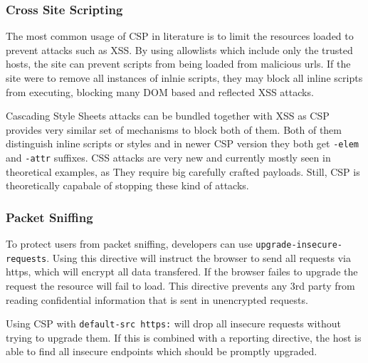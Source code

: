 \subsubsection{Cross Site Scripting}
The most common usage of CSP in literature is to limit the resources loaded to prevent attacks such as XSS.
By using allowlists which include only the trusted hosts, the site can prevent scripts from being loaded from malicious urls.
If the site were to remove all instances of inlnie scripts, they may block all inline scripts from executing, blocking many DOM based and reflected XSS attacks.

Cascading Style Sheets attacks can be bundled together with XSS as CSP provides very similar set of mechanisms to block both of them.
Both of them distinguish inline scripts or styles and in newer CSP version they both get \texttt{-elem} and \texttt{-attr} suffixes.
CSS attacks are very new and currently mostly seen in theoretical examples, as They require big carefully crafted payloads.
Still, CSP is theoretically capabale of stopping these kind of attacks.

\subsubsection{Packet Sniffing}
To protect users from packet sniffing, developers can use \texttt{upgrade-insecure-requests}.
Using this directive will instruct the browser to send all requests via https, which will encrypt all data transfered.
If the browser failes to upgrade the request the resource will fail to load.
This directive prevents any 3rd party from reading confidential information that is sent in unencrypted requests.

Using CSP with \texttt{default-src https:} will drop all insecure requests without trying to upgrade them.
If this is combined with a reporting directive, the host is able to find all insecure endpoints which should be promptly upgraded.

